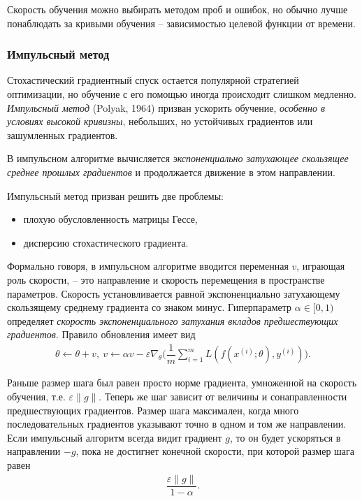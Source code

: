\documentclass[%
	11pt,
	a4paper,
	utf8,
]{article}
\begin{document}
Скорость обучения можно выбирать методом проб и ошибок, но обычно лучше понаблюдать за кривыми обучения -- зависимостью целевой функции от времени.

\subsubsection{Импульсный метод}

Стохастический градиентный спуск остается популярной стратегией оптимизации, но обучение с его помощью иногда происходит слишком медленно. \emph{Импульсный метод} (Polyak, 1964) призван ускорить обучение, \emph{особенно в условиях высокой кривизны}, небольших, но устойчивых градиентов или зашумленных градиентов.

В импульсном алгоритме вычисляется \emph{экспоненциально затухающее скользящее среднее прошлых градиентов} и продолжается движение в этом направлении.

Импульсный метод призван решить две проблемы:
\begin{itemize}
	\item плохую обусловленность матрицы Гессе,
	
	\item дисперсию стохастического градиента.
\end{itemize}

Формально говоря, в импульсном алгоритме вводится переменная $ v $, играющая роль скорости, -- это направление и скорость перемещения в пространстве параметров. Скорость установливается равной экспоненциально затухающему скользящему среднему градиента со знаком минус. Гиперпараметр $ \alpha \in [0, 1) $ определяет \emph{скорость экспоненциального затухания вкладов предшествующих градиентов}. Правило обновления имеет вид
\begin{align*}
	\theta \leftarrow \theta +v, \ v \leftarrow \alpha v - \varepsilon \nabla_\theta \Big( \dfrac{1}{m} \sum_{i=1}^m L(f(x^{(i)}; \theta), y^{(i)}) \Big).
\end{align*}

Раньше размер шага был равен просто норме градиента, умноженной на скорость обучения, т.е. $ \varepsilon \| g \| $. Теперь же шаг зависит от величины и сонаправленности предшествующих градиентов. Размер шага максимален, когда много последовательных градиентов указывают точно в одном и том же направлении. Если импульсный алгоритм всегда видит градиент $ g $, то он будет ускоряться в направлении $ -g $, пока не достигнет конечной скорости, при которой размер шага равен
\begin{align*}
	\dfrac{\varepsilon \| g \|}{1 - \alpha}.
\end{align*}
\end{document}
